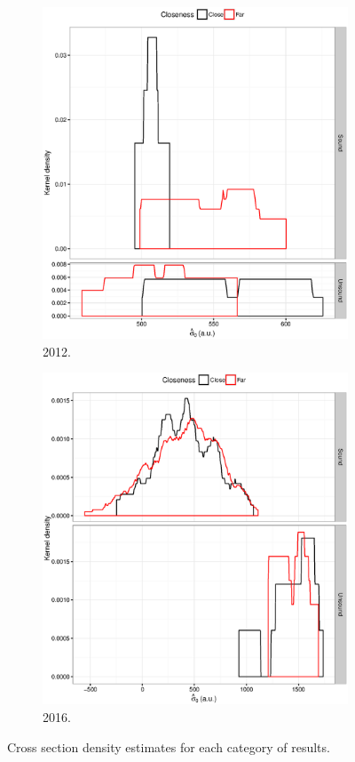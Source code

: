 \documentclass[reprint]{revtex4-1}
\newcommand{\scl}{.4}
\begin{document}
\begin{figure}
\centering
	\begin{subfigure}[b]{.5\textwidth}
		\includegraphics[scale=\scl]{img/Cross-Section2012_dens.eps}
		\caption{2012.}
	\end{subfigure}
	\begin{subfigure}[b]{.5\textwidth}
		\includegraphics[scale=\scl]{img/CS0mb2016_dens.eps}
		\caption{2016.}
	\end{subfigure}
	\caption{Cross section density estimates for each category of results.\label{fig:CS-dens}}
\end{figure}
\end{document}
